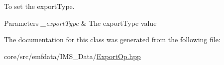 To set the exportType. 


\begin{DoxyParams}{Parameters}
{\em \_\-exportType} & The exportType value \\
\hline
\end{DoxyParams}


The documentation for this class was generated from the following file:\begin{DoxyCompactItemize}
\item 
core/src/emfdata/IMS\_\-Data/\hyperlink{ExportOp_8hpp}{ExportOp.hpp}\end{DoxyCompactItemize}
